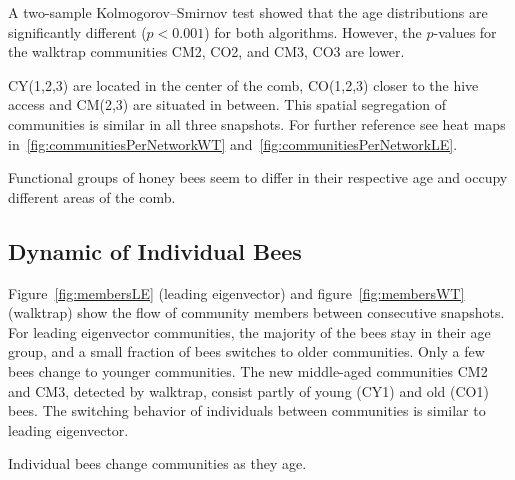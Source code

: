 A two-sample Kolmogorov–Smirnov test showed that the age distributions are significantly different ($p< 0.001$) for both algorithms. However, the $p$-values for the walktrap communities CM2, CO2, and CM3, CO3 are lower.

CY(1,2,3) are located in the center of the comb, CO(1,2,3) closer to the hive access and CM(2,3) are situated in between. This spatial segregation of communities is similar in all three snapshots. For further reference see heat maps in~\ref{fig:communitiesPerNetworkWT} and~\ref{fig:communitiesPerNetworkLE}.


Functional groups of honey bees seem to differ in their respective age and occupy different areas of the comb.






\subsection{Dynamic of Individual Bees}
Figure~\ref{fig:membersLE} (leading eigenvector) and figure~\ref{fig:membersWT} (walktrap) show the flow of  community members between consecutive snapshots.
For leading eigenvector communities, the majority of the bees stay in their age group, and a small fraction of bees switches to older communities.
Only a few bees change to younger communities.
The new middle-aged communities CM2 and CM3, detected by walktrap, consist partly of young (CY1) and old (CO1) bees. The switching behavior of individuals between communities is similar to leading eigenvector.

Individual bees change communities as they age.

